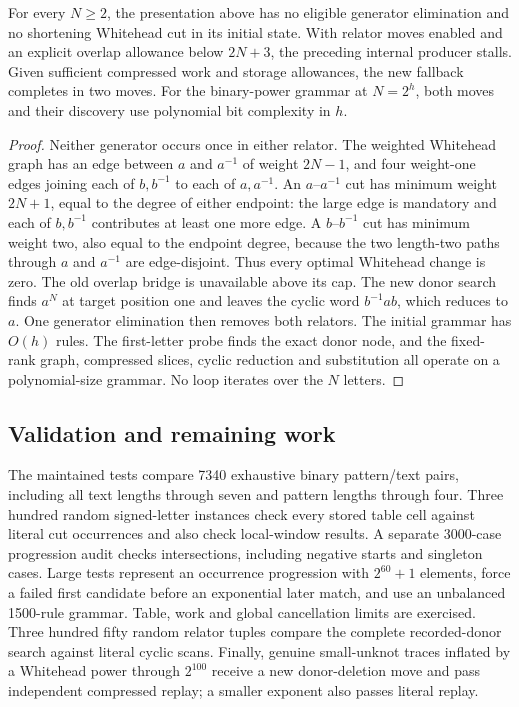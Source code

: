 \begin{proposition}
For every $N\ge2$, the presentation above has no eligible generator
elimination and no shortening Whitehead cut in its initial state. With relator moves enabled and an
explicit overlap allowance below $2N+3$, the preceding internal producer stalls.
Given sufficient compressed work and storage allowances, the new fallback
completes in two moves. For the binary-power grammar at
$N=2^h$, both moves and their discovery use polynomial bit complexity in $h$.
\end{proposition}
\begin{proof}
Neither generator occurs once in either relator. The weighted Whitehead
graph has an edge between $a$ and $a^{-1}$ of weight $2N-1$, and four
weight-one edges joining each of $b,b^{-1}$ to each of $a,a^{-1}$.
An $a$--$a^{-1}$ cut has minimum weight $2N+1$, equal to the degree
of either endpoint: the large edge is mandatory and each of $b,b^{-1}$
contributes at least one more edge. A $b$--$b^{-1}$ cut has minimum weight
two, also equal to the endpoint degree, because the two length-two paths
through $a$ and $a^{-1}$ are edge-disjoint. Thus every optimal Whitehead
change is zero. The old overlap bridge is unavailable above its cap.
The new donor search finds $a^N$ at target position one and leaves the
cyclic word $b^{-1}ab$, which reduces to $a$. One generator elimination
then removes both relators. The initial grammar has $O(h)$ rules. The
first-letter probe finds the exact donor node, and the fixed-rank graph,
compressed slices, cyclic reduction and substitution all operate on a
polynomial-size grammar. No loop iterates over the $N$ letters.
\end{proof}

\subsection{Validation and remaining work}

The maintained tests compare 7340 exhaustive binary pattern/text pairs,
including all text lengths through seven and pattern lengths through four.
Three hundred random signed-letter instances check every stored table cell
against literal cut occurrences and also check local-window results. A
separate 3000-case progression audit checks intersections, including negative
starts and singleton cases. Large tests represent an occurrence progression
with $2^{60}+1$ elements, force a failed first candidate before an exponential
later match, and use an unbalanced 1500-rule grammar. Table, work and global
cancellation limits are exercised. Three hundred fifty random relator tuples
compare the complete recorded-donor search against literal cyclic scans.
Finally, genuine small-unknot traces inflated by a Whitehead power through
$2^{100}$ receive a new donor-deletion move and pass independent compressed
replay; a smaller exponent also passes literal replay.

